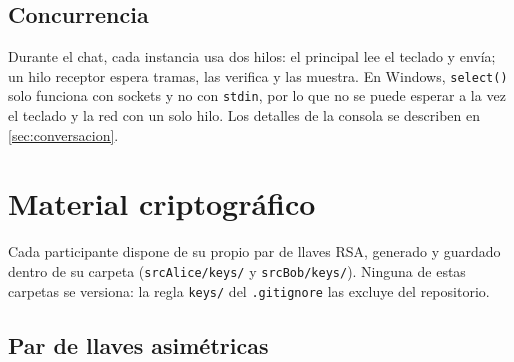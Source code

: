 \documentclass[11pt,a4paper]{article}
\theoremstyle{definition}
\theoremstyle{remark}
\newcommand{\code}[1]{\texttt{#1}}
\begin{document}
\subsection{Concurrencia}
\label{subsec:concurrencia}

Durante el chat, cada instancia usa dos hilos: el principal lee el teclado y
envía; un hilo receptor espera tramas, las verifica y las muestra. En
Windows, \code{select()} solo funciona con sockets y no con \code{stdin},
por lo que no se puede esperar a la vez el teclado y la red con un solo
hilo. Los detalles de la consola se describen en
\cref{sec:conversacion}.

\section{Material criptográfico}
\label{sec:material}

Cada participante dispone de su propio par de llaves RSA, generado y
guardado dentro de su carpeta (\code{srcAlice/keys/} y \code{srcBob/keys/}).
Ninguna de estas carpetas se versiona: la regla \code{keys/} del
\code{.gitignore} las excluye del repositorio.

\subsection{Par de llaves asimétricas}
\label{subsec:rsa}
\end{document}
